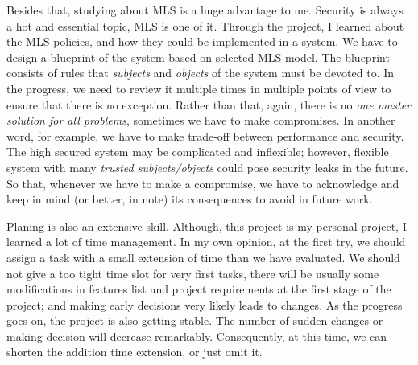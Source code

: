 Besides that, studying about MLS is a huge advantage to me.
Security is always a hot and essential topic, MLS is one of it.
Through the project, I learned about the MLS policies, and how they could be implemented in a system.
We have to design a blueprint of the system based on selected MLS model.
The blueprint consists of rules that \emph{subjects} and \emph{objects} of the system must be devoted to.
In the progress, we need to review it multiple times in multiple points of view to ensure that there is no exception.
Rather than that, again, there is no \emph{one master solution for all problems}, sometimes we have to make compromises.
In another word, for example, we have to make trade-off between performance and security.
The high secured system may be complicated and inflexible; however, flexible system with many \emph{trusted subjects/objects} could pose security leaks in the future.
So that, whenever we have to make a compromise, we have to acknowledge and keep in mind (or better, in note) its consequences to avoid in future work.

Planing is also an extensive skill.
Although, this project is my personal project, I learned a lot of time management.
In my own opinion, at the first try, we should assign a task with a small extension of time than we have evaluated.
We should not give a too tight time slot for very first tasks, there will be usually some modifications in features list and project requirements at the first stage of the project; and making early decisions very likely leads to changes.
As the progress goes on, the project is also getting stable.
The number of sudden changes or making decision will decrease remarkably.
Consequently, at this time, we can shorten the addition time extension, or just omit it.

